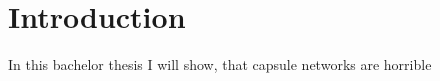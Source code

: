 \section{Introduction}
\label{sec:introduction}

In this bachelor thesis I will show, that capsule networks are horrible